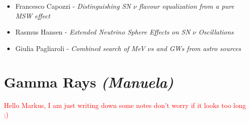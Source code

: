 \documentclass{PoS}
\begin{document}
\begin{itemize}
\item Francesco Capozzi - {\it Distinguishing SN $\nu$ flavour equalization from a pure MSW effect}
\item Rasmus Hansen - {\it Extended Neutrino Sphere Effects on SN $\nu$ Oscillations}
\item Giulia Pagliaroli - {\it Combined search of MeV $\nu$s and GWs from astro sources}
\end{itemize}

\section{Gamma Rays {\it (Manuela)}}
\textcolor{red}{Hello Markus, I am just writing down some notes  don't worry if it looks too long ;)}
\end{document}
